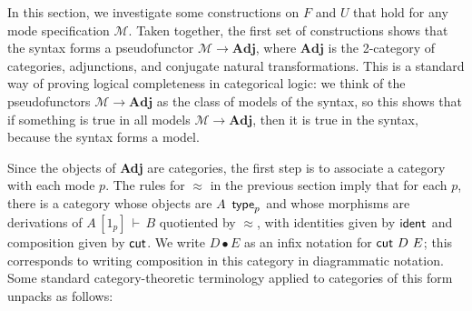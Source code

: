 \documentclass{drl-common/llncs}
\newcommand{\M}{\ensuremath{\mathcal{M}}}
\newcommand{\Adj}{\textbf{Adj}}
\renewcommand\wftp[2]{\ensuremath{#1 \,\,\, \dsd{type}_{#2}}}
\newcommand\seq[3]{\ensuremath{#1 \, [ #2 ] \, \vdash \, #3}}
\newcommand\ident[1]{\ensuremath{\dsd{ident}_{#1}}}
\newcommand\cutsym{\ensuremath{\dsd{cut}}}
\newcommand\cut[2]{\ensuremath{{\cutsym \,\, #1 \,\, #2}}}
\newcommand\cuti{\ensuremath{\bullet}}
\newcommand\ap[2]{\ensuremath{#1 \approx #2}}
\begin{document}
In this section, we investigate some constructions on $F$ and $U$ that
hold for any mode specification $\M$.  Taken together, the first set of
constructions shows that the syntax forms a pseudofunctor $\M \to \Adj$,
where $\Adj$ is the 2-category of categories, adjunctions, and conjugate
natural transformations.  This is a standard way of proving logical
completeness in categorical logic: we think of the pseudofunctors $\M
\to \Adj$ as the class of models of the syntax, so this shows that if
something is true in all models $\M \to \Adj$, then it is true in the
syntax, because the syntax forms a model.  

Since the objects of \Adj\/ are categories,
the first step is to associate a category with each mode $p$.  The rules
for $\ap{}{}$ in the previous section imply that for each $p$, there is
a category whose objects are \wftp{A}{p} and whose morphisms are
derivations of \seq{A}{1_p}{B} quotiented by $\ap{}{}$, with identities
given by \ident{} and composition given by \cutsym.  We write $D \cuti
E$ as an infix notation for \cut{D}{E}; this corresponds to writing
composition in this category in diagrammatic notation. Some standard
category-theoretic terminology applied to categories of this form
unpacks as follows:
\end{document}
